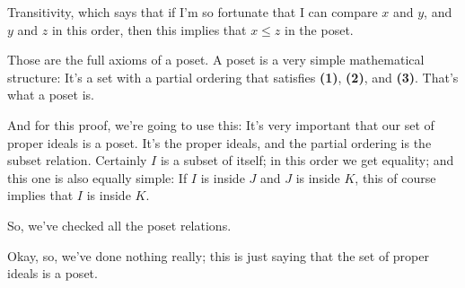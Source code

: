 \begin{speech}[00:31:24 - 00:32:23]
Transitivity, which says that if I'm so fortunate that I can compare $x$ and $y$, and $y$ and $z$ in this order, then this implies that $x \le z$ in the poset. 

Those are the full axioms of a poset. A poset is a very simple mathematical structure: It's a set with a partial ordering that satisfies \textbf{(1)}, \textbf{(2)}, and \textbf{(3)}. That's what a poset is.

And for this proof, we're going to use this: It's very important that our set of proper ideals is a poset. It's the proper ideals, and the partial ordering is the subset relation. Certainly $I$ is a subset of itself; in this order we get equality; and this one is also equally simple: If $I$ is inside $J$ and $J$ is inside $K$, this of course implies that $I$ is inside $K$. 

So, we've checked all the poset relations.

Okay, so, we've done nothing really; this is just saying that the set of proper ideals is a poset.
\end{speech}

